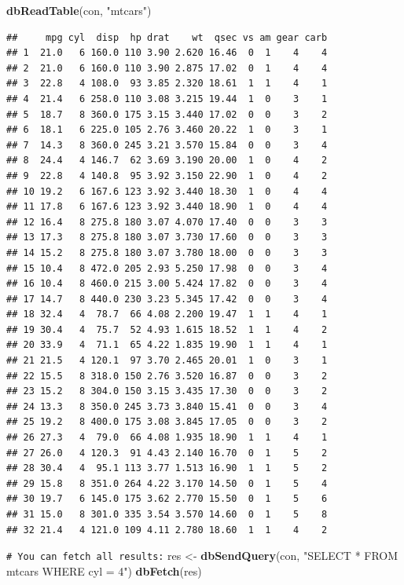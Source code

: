\documentclass[
]{book}
\newenvironment{Shaded}{\begin{snugshade}}{\end{snugshade}}
\newcommand{\CommentTok}[1]{\textcolor[rgb]{0.56,0.35,0.01}{\textit{#1}}}
\newcommand{\FunctionTok}[1]{\textcolor[rgb]{0.13,0.29,0.53}{\textbf{#1}}}
\newcommand{\NormalTok}[1]{#1}
\newcommand{\OtherTok}[1]{\textcolor[rgb]{0.56,0.35,0.01}{#1}}
\newcommand{\StringTok}[1]{\textcolor[rgb]{0.31,0.60,0.02}{#1}}
\theoremstyle{break}
\theoremstyle{nonumberplain}
\renewcommand{\CommentTok}[1]{\textcolor[rgb]{0.41,0.41,0.41}{\texttt{#1}}}
\begin{document}
\begin{Shaded}
\begin{Highlighting}[]
\FunctionTok{dbReadTable}\NormalTok{(con, }\StringTok{"mtcars"}\NormalTok{)}
\end{Highlighting}
\end{Shaded}

\begin{verbatim}
##     mpg cyl  disp  hp drat    wt  qsec vs am gear carb
## 1  21.0   6 160.0 110 3.90 2.620 16.46  0  1    4    4
## 2  21.0   6 160.0 110 3.90 2.875 17.02  0  1    4    4
## 3  22.8   4 108.0  93 3.85 2.320 18.61  1  1    4    1
## 4  21.4   6 258.0 110 3.08 3.215 19.44  1  0    3    1
## 5  18.7   8 360.0 175 3.15 3.440 17.02  0  0    3    2
## 6  18.1   6 225.0 105 2.76 3.460 20.22  1  0    3    1
## 7  14.3   8 360.0 245 3.21 3.570 15.84  0  0    3    4
## 8  24.4   4 146.7  62 3.69 3.190 20.00  1  0    4    2
## 9  22.8   4 140.8  95 3.92 3.150 22.90  1  0    4    2
## 10 19.2   6 167.6 123 3.92 3.440 18.30  1  0    4    4
## 11 17.8   6 167.6 123 3.92 3.440 18.90  1  0    4    4
## 12 16.4   8 275.8 180 3.07 4.070 17.40  0  0    3    3
## 13 17.3   8 275.8 180 3.07 3.730 17.60  0  0    3    3
## 14 15.2   8 275.8 180 3.07 3.780 18.00  0  0    3    3
## 15 10.4   8 472.0 205 2.93 5.250 17.98  0  0    3    4
## 16 10.4   8 460.0 215 3.00 5.424 17.82  0  0    3    4
## 17 14.7   8 440.0 230 3.23 5.345 17.42  0  0    3    4
## 18 32.4   4  78.7  66 4.08 2.200 19.47  1  1    4    1
## 19 30.4   4  75.7  52 4.93 1.615 18.52  1  1    4    2
## 20 33.9   4  71.1  65 4.22 1.835 19.90  1  1    4    1
## 21 21.5   4 120.1  97 3.70 2.465 20.01  1  0    3    1
## 22 15.5   8 318.0 150 2.76 3.520 16.87  0  0    3    2
## 23 15.2   8 304.0 150 3.15 3.435 17.30  0  0    3    2
## 24 13.3   8 350.0 245 3.73 3.840 15.41  0  0    3    4
## 25 19.2   8 400.0 175 3.08 3.845 17.05  0  0    3    2
## 26 27.3   4  79.0  66 4.08 1.935 18.90  1  1    4    1
## 27 26.0   4 120.3  91 4.43 2.140 16.70  0  1    5    2
## 28 30.4   4  95.1 113 3.77 1.513 16.90  1  1    5    2
## 29 15.8   8 351.0 264 4.22 3.170 14.50  0  1    5    4
## 30 19.7   6 145.0 175 3.62 2.770 15.50  0  1    5    6
## 31 15.0   8 301.0 335 3.54 3.570 14.60  0  1    5    8
## 32 21.4   4 121.0 109 4.11 2.780 18.60  1  1    4    2
\end{verbatim}

\begin{Shaded}
\begin{Highlighting}[]
\CommentTok{\# You can fetch all results:}
\NormalTok{res }\OtherTok{\textless{}{-}} \FunctionTok{dbSendQuery}\NormalTok{(con, }\StringTok{"SELECT * FROM mtcars WHERE cyl = 4"}\NormalTok{)}
\FunctionTok{dbFetch}\NormalTok{(res)}
\end{Highlighting}
\end{Shaded}
\end{document}

